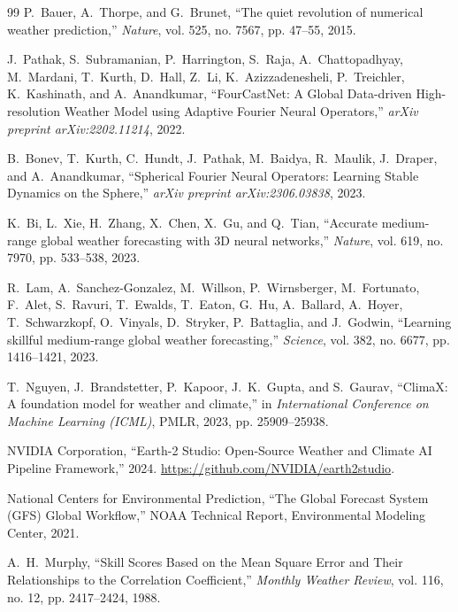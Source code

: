 \documentclass[10pt,twocolumn,letterpaper]{article}
\begin{document}
\begin{thebibliography}{99}
\small
\setlength{\itemsep}{1pt}
P.~Bauer, A.~Thorpe, and G.~Brunet, ``The quiet revolution of numerical weather prediction,'' \emph{Nature}, vol. 525, no. 7567, pp. 47--55, 2015.

J.~Pathak, S.~Subramanian, P.~Harrington, S.~Raja, A.~Chattopadhyay, M.~Mardani, T.~Kurth, D.~Hall, Z.~Li, K.~Azizzadenesheli, P.~Treichler, K.~Kashinath, and A.~Anandkumar, ``FourCastNet: A Global Data-driven High-resolution Weather Model using Adaptive Fourier Neural Operators,'' \emph{arXiv preprint arXiv:2202.11214}, 2022.

B.~Bonev, T.~Kurth, C.~Hundt, J.~Pathak, M.~Baidya, R.~Maulik, J.~Draper, and A.~Anandkumar, ``Spherical Fourier Neural Operators: Learning Stable Dynamics on the Sphere,'' \emph{arXiv preprint arXiv:2306.03838}, 2023.

K.~Bi, L.~Xie, H.~Zhang, X.~Chen, X.~Gu, and Q.~Tian, ``Accurate medium-range global weather forecasting with 3D neural networks,'' \emph{Nature}, vol. 619, no. 7970, pp. 533--538, 2023.

R.~Lam, A.~Sanchez-Gonzalez, M.~Willson, P.~Wirnsberger, M.~Fortunato, F.~Alet, S.~Ravuri, T.~Ewalds, T.~Eaton, G.~Hu, A.~Ballard, A.~Hoyer, T.~Schwarzkopf, O.~Vinyals, D.~Stryker, P.~Battaglia, and J.~Godwin, ``Learning skillful medium-range global weather forecasting,'' \emph{Science}, vol. 382, no. 6677, pp. 1416--1421, 2023.

T.~Nguyen, J.~Brandstetter, P.~Kapoor, J.~K.~Gupta, and S.~Gaurav, ``ClimaX: A foundation model for weather and climate,'' in \emph{International Conference on Machine Learning (ICML)}, PMLR, 2023, pp. 25909--25938.

NVIDIA Corporation, ``Earth-2 Studio: Open-Source Weather and Climate AI Pipeline Framework,'' 2024. \url{https://github.com/NVIDIA/earth2studio}.

National Centers for Environmental Prediction, ``The Global Forecast System (GFS) Global Workflow,'' NOAA Technical Report, Environmental Modeling Center, 2021.

A.~H.~Murphy, ``Skill Scores Based on the Mean Square Error and Their Relationships to the Correlation Coefficient,'' \emph{Monthly Weather Review}, vol. 116, no. 12, pp. 2417--2424, 1988.


\end{thebibliography}
\end{document}
